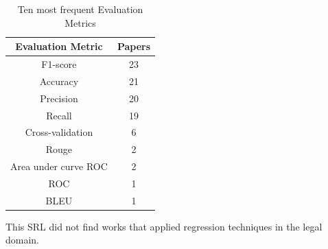 \begin{table}[H]
\centering
\caption{Ten most frequent Evaluation Metrics}
\label{tab:rsl_freq_evaluation}
\begin{tabular}{cc}
\hline
\textbf{Evaluation Metric} & \textbf{Papers} \\ \hline
F1-score                   & 23              \\
Accuracy                   & 21              \\
Precision                  & 20              \\
Recall                     & 19              \\
Cross-validation           & 6               \\
Rouge                      & 2               \\
Area under curve ROC       & 2               \\
ROC                        & 1               \\
BLEU                       & 1               \\ \hline
\end{tabular}
\end{table}



This SRL did not find works that applied regression techniques in the legal domain.




